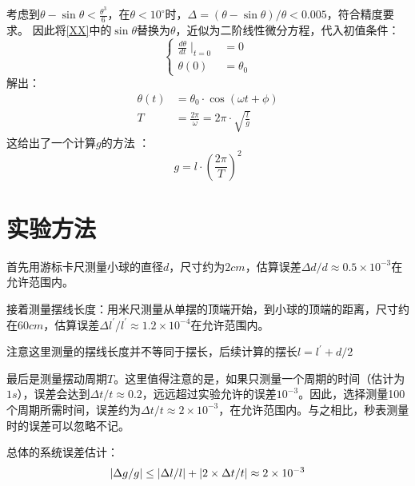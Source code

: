\documentclass[a4paper]{ltxdoc}
\begin{document}
\begin{multicols}{2}
  考虑到$\theta - \sin \theta<\frac {\theta^3} 6$，在$\theta < 10 ^{\circ}$时，$\Delta = (\theta - \sin\theta)/\theta < 0.005$，符合精度要求。
  因此将\eqref{XX}中的$\sin\theta$替换为$\theta$，近似为二阶线性微分方程，代入初值条件：
  $$\left\{
    \begin{aligned}
      \frac {d\theta} {dt} \mid _{t = 0} & = 0        \\
      \theta (0)                         & = \theta_0
    \end{aligned}
    \right.$$
  解出：
  \begin{equation}
    \begin{aligned}
      \theta(t) & =\theta_0\cdot\cos (\omega t+\phi)                  \\
      T         & = \frac {2\pi}{\omega} = 2\pi \cdot\sqrt{\frac l g}
    \end{aligned}
  \end{equation}
  这给出了一个计算$g$的方法
  ：
  \begin{equation}
    g = l \cdot (\frac {2\pi} T)^2 \label{XY}
  \end{equation}
  \section{实验方法}
  首先用游标卡尺测量小球的直径$d$，尺寸约为$2cm$，估算误差$\Delta d /d\approx 0.5 \times 10^{-3}$在允许范围内。

  接着测量摆线长度：用米尺测量从单摆的顶端开始，到小球的顶端的距离，尺寸约在$60cm$，估算误差$\Delta l^{\prime} /l^{\prime} \approx 1.2 \times 10^{-4}$在允许范围内。

  注意这里测量的摆线长度并不等同于摆长，后续计算的摆长$l=l^{\prime} + d/2$

  最后是测量摆动周期$T$。这里值得注意的是，如果只测量一个周期的时间（估计为$1s$），误差会达到$\Delta t/t\approx 0.2$，远远超过实验允许的误差$10^{-3}$。因此，选择测量100个周期所需时间，误差约为$\Delta t/t\approx 2\times 10^{-3}$，在允许范围内。与之相比，秒表测量时的误差可以忽略不记。

  总体的系统误差估计：
  $$\lvert\Delta g/g\rvert \leq \lvert\Delta l/l\rvert + \lvert2\times \Delta t/t\rvert\\
    \approx 2\times 10^{-3}$$


\end{multicols}
\end{document}
